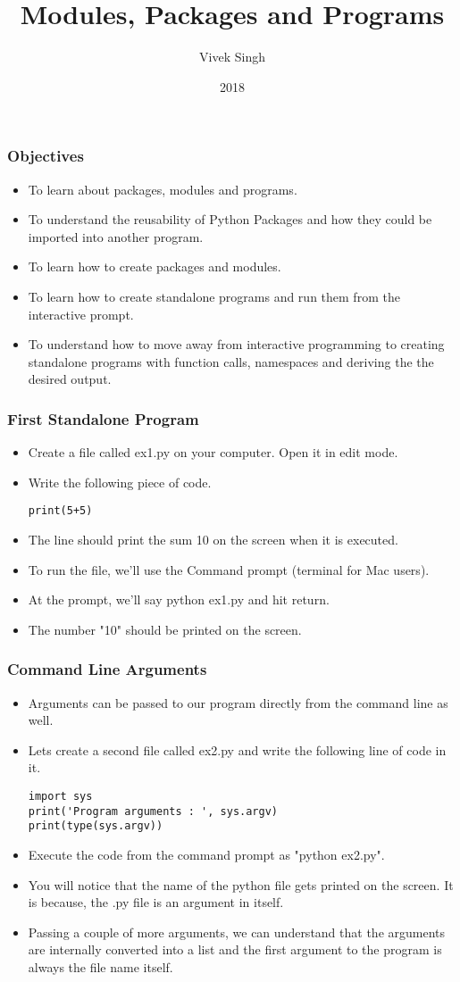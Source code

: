 \documentclass{beamer}
\title{Modules, Packages and Programs}
\author{Vivek Singh}
\institute{Information Systems Decision Sciences (ISDS)\\
MUMA College of Business\\
University of South Florida \\
Tampa, Florida}
\date{2018}
\begin{document}
\frame{\titlepage}

\begin{frame}
\frametitle{Objectives}
\begin{itemize}
\item To learn about packages, modules and programs.
\item To understand the reusability of Python Packages and how they could be imported  into another program.
\item To learn how to create packages and modules.
\item To learn how to create standalone programs and run them from the interactive prompt.
\item To understand how to move away from interactive programming to creating standalone programs with function calls, namespaces and deriving the the desired output.
\end{itemize}
\end{frame}


\begin{frame}[fragile]
\frametitle{First Standalone Program}
\begin{itemize}
\item Create a file called ex1.py on your computer. Open it in edit mode.
\item Write the following piece of code.
\begin{lstlisting}
print(5+5)
\end{lstlisting}
\item The line should print the sum 10 on the screen when it is executed.
\item To run the file, we'll use the Command  prompt (terminal for Mac users).
\item At the prompt, we'll say python ex1.py and hit return.
\item The number "10" should be printed on the screen.
\end{itemize}
\end{frame}

\begin{frame}[fragile]
\frametitle{Command Line Arguments}
\begin{itemize}
\item Arguments can be passed to our program directly from the command line as well.
\item Lets create a second file called ex2.py and write the following line of code in it.
\begin{lstlisting}
import sys
print('Program arguments : ', sys.argv)
print(type(sys.argv))
\end{lstlisting}
\item Execute the code from the command prompt as "python ex2.py".
\item You will notice that the name of the python file gets printed on the screen. It is because, the .py file is an argument in itself.
\item Passing a couple of more arguments, we can understand that the arguments are internally converted into a list and the first argument to the program is always the file name itself. 
\end{itemize}
\end{frame}
\end{document}
